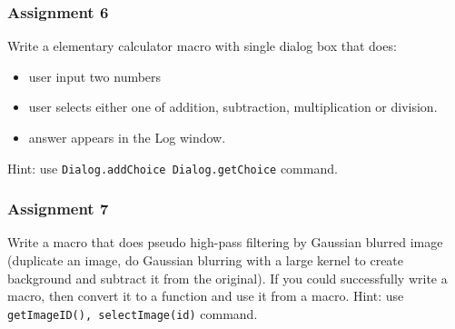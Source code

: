 \documentclass[11pt,a4paper,oneside]{report}
\newcommand{\ilcom}[1]{\texttt{\small#1}}
\begin{document}
\subsubsection{Assignment 6}
Write a elementary calculator macro with single dialog box that does:
\begin{itemize}
\item user input two numbers
\item user selects either one of addition, subtraction, multiplication or division. 
\item answer appears in the Log window. 
 \end{itemize}
Hint: use \ilcom{Dialog.addChoice Dialog.getChoice} command.   

\subsubsection{Assignment 7}
Write a macro that does pseudo high-pass filtering by Gaussian blurred image
(duplicate an image, do Gaussian blurring with a large kernel to create
background and subtract it from the original). If you could successfully write a
macro, then convert it to a function and use it from a macro.
Hint: use \ilcom{getImageID(), selectImage(id)} command.   
\end{document}
